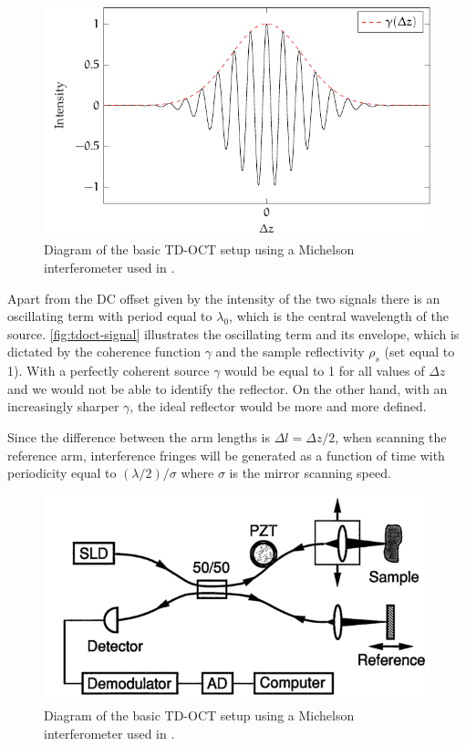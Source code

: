 \begin{figure}[hbt]
	\myfloatalign
	\includegraphics[width=0.8\linewidth]{gfx/tikz/tdoct-signal}
	\caption{Diagram of the basic \ac{TD-OCT} setup using a Michelson interferometer used in \cite{Huang1991}.}\label{fig:tdoct-signal}
\end{figure}


Apart from the DC offset given by the intensity of the two signals there is an oscillating term with period equal to $\lambda_0$, which is the central wavelength of the source. \autoref{fig:tdoct-signal} illustrates the oscillating term and its envelope, which is dictated by the coherence function $\gamma$ and the sample reflectivity $\rho_s$ (set equal to 1). With a perfectly coherent source $\gamma$ would be equal to 1 for all values of $\Delta z $ and we would not be able to identify the reflector. On the other hand, with an increasingly sharper $\gamma$, the ideal reflector would be more and more defined. 


Since the difference between the arm lengths is $\Delta l = \Delta z / 2$, when scanning the reference arm, interference fringes will be generated as a function of time with periodicity equal to $(\lambda/2) / \sigma$ where $\sigma$ is the mirror scanning speed. 

 
\begin{figure}[hbt]
	\myfloatalign
	\includegraphics[width=0.8\linewidth]{gfx/ch2/huang-setup}
	\caption{Diagram of the basic \ac{TD-OCT} setup using a Michelson interferometer used in \cite{Huang1991}.}\label{fig:huang-setup}
\end{figure}

